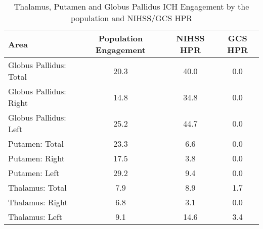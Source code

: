 \begin{table}[ht]
\centering
\begin{tabular}{lccc}
  \hline
Area & Population Engagement & NIHSS HPR & GCS HPR \\ 
  \hline
Globus Pallidus: Total & 20.3 & 40.0 & 0.0 \\ 
  Globus Pallidus: Right & 14.8 & 34.8 & 0.0 \\ 
  Globus Pallidus: Left & 25.2 & 44.7 & 0.0 \\ 
  Putamen: Total & 23.3 & 6.6 & 0.0 \\ 
  Putamen: Right & 17.5 & 3.8 & 0.0 \\ 
  Putamen: Left & 29.2 & 9.4 & 0.0 \\ 
  Thalamus: Total & 7.9 & 8.9 & 1.7 \\ 
  Thalamus: Right & 6.8 & 3.1 & 0.0 \\ 
  Thalamus: Left & 9.1 & 14.6 & 3.4 \\ 
   \hline
\end{tabular}
\caption{Thalamus, Putamen and Globus Pallidus ICH Engagement by the population and NIHSS/GCS HPR} 
\label{t:area_breakdown}
\end{table}
